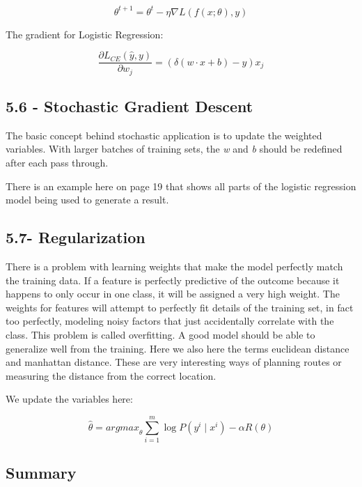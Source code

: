 \documentclass{article}
\begin{document}
\[
    \theta^{t+1} = \theta^{t} - \eta \nabla L (f(x;\theta), y)
\]

The gradient for Logistic Regression:

\[
    \frac{\partial L_{CE}(\hat{y}, y)}{\partial w_j} = (\delta (w \cdot x + b) - y) x_j
\]

\subsection{5.6 - Stochastic Gradient Descent}

The basic concept behind stochastic application is to update the weighted variables.
With larger batches of training sets, the \textit{w} and \textit{b} should be redefined after each pass through. \newline

There is an example here on page 19 that shows all parts of the logistic regression model being used to generate a result.

\subsection{5.7- Regularization}

There is a problem with learning weights that make the model perfectly match the
training data. If a feature is perfectly predictive of the outcome because it happens
to only occur in one class, it will be assigned a very high weight. The weights for
features will attempt to perfectly fit details of the training set, in fact too perfectly,
modeling noisy factors that just accidentally correlate with the class. This problem is
called overfitting. A good model should be able to generalize well from the training.\newline
Here we also here the terms euclidean distance and manhattan distance. These are very interesting ways
of planning routes or measuring the distance from the correct location.

We update the variables here:

\[
    \hat{\theta} = {argmax}_{\theta} \sum_{i=1}^{m} \log P(y^i \mid x^i) - \alpha R(\theta)
\]
\subsection{Summary}
\end{document}

